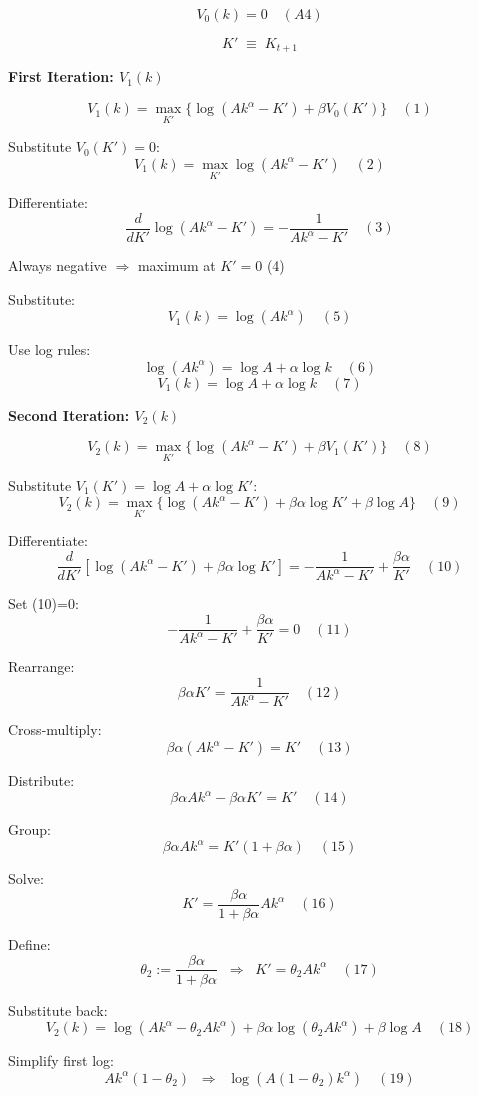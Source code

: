 \documentclass[12pt]{article}
\begin{document}
\[
V_0(k)=0 \quad (A4)
\]

\[
\boxed{\,K' \;\equiv\; K_{t+1}\,}
\]

\textbf{First Iteration: \(V_1(k)\)}

\[
V_1(k)=\max_{K'}\{\log(Ak^{\alpha}-K')+\beta V_0(K')\} \quad (1)
\]

Substitute \(V_0(K')=0\):
\[
V_1(k)=\max_{K'} \log(Ak^{\alpha}-K') \quad (2)
\]

Differentiate:
\[
\frac{d}{dK'}\log(Ak^{\alpha}-K')=-\frac{1}{Ak^{\alpha}-K'} \quad (3)
\]

Always negative \(\Rightarrow\) maximum at \(K'=0\) \quad (4)

Substitute:
\[
V_1(k)=\log(Ak^{\alpha}) \quad (5)
\]

Use log rules:
\[
\log(Ak^{\alpha})=\log A + \alpha \log k \quad (6)
\]
\[
V_1(k)=\log A + \alpha \log k \quad (7)
\]

\textbf{Second Iteration: \(V_2(k)\)}

\[
V_2(k)=\max_{K'}\{\log(Ak^{\alpha}-K')+\beta V_1(K')\} \quad (8)
\]

Substitute \(V_1(K')=\log A + \alpha \log K'\):
\[
V_2(k)=\max_{K'}\{\log(Ak^{\alpha}-K')+\beta\alpha \log K' + \beta \log A\} \quad (9)
\]

Differentiate:
\[
\frac{d}{dK'}[\log(Ak^{\alpha}-K')+\beta\alpha \log K']=-\frac{1}{Ak^{\alpha}-K'}+\frac{\beta\alpha}{K'} \quad (10)
\]

Set (10)=0:
\[
-\frac{1}{Ak^{\alpha}-K'}+\frac{\beta\alpha}{K'}=0 \quad (11)
\]

Rearrange:
\[
\beta\alpha K'=\frac{1}{Ak^{\alpha}-K'} \quad (12)
\]

Cross-multiply:
\[
\beta\alpha(Ak^{\alpha}-K')=K' \quad (13)
\]

Distribute:
\[
\beta\alpha Ak^{\alpha}-\beta\alpha K'=K' \quad (14)
\]

Group:
\[
\beta\alpha Ak^{\alpha}=K'(1+\beta\alpha) \quad (15)
\]

Solve:
\[
K'=\frac{\beta\alpha}{1+\beta\alpha}Ak^{\alpha} \quad (16)
\]

Define:
\[
\theta_2:=\frac{\beta\alpha}{1+\beta\alpha} \;\;\Rightarrow\;\; K'=\theta_2 Ak^{\alpha} \quad (17)
\]

Substitute back:
\[
V_2(k)=\log(Ak^{\alpha}-\theta_2 Ak^{\alpha})+\beta\alpha\log(\theta_2 Ak^{\alpha})+\beta\log A \quad (18)
\]

Simplify first log:
\[
Ak^{\alpha}(1-\theta_2) \;\;\Rightarrow\;\; \log(A(1-\theta_2)k^{\alpha}) \quad (19)
\]
\end{document}
